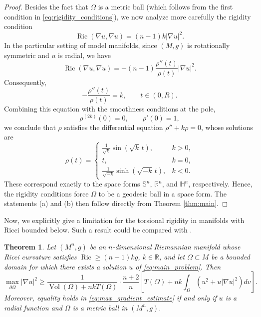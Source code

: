 \documentclass[reqno,11pt]{amsart}
\numberwithin{equation}{section}  %
\newtheorem{theorem}{Theorem}[section]
\begin{document}
\begin{proof}
Besides the fact that $\Omega$ is a metric ball (which follows from the first condition in \eqref{eq:rigidity_conditions}), we now analyze more carefully the rigidity condition
\[\operatorname{Ric}(\nabla u,\nabla u) = (n-1)k|\nabla u|^2.\]
In the particular setting of model manifolds, since $(M,g)$ is rotationally symmetric and $u$ is radial, we have
\[\operatorname{Ric}(\nabla u,\nabla u) = -(n-1)\frac{\rho''(t)}{\rho(t)}|\nabla u|^2.\]
Consequently,
\[-\frac{\rho''(t)}{\rho(t)} = k,\qquad t\in(0,R).\]
Combining this equation with the smoothness conditions at the pole,
\[\rho^{(2k)}(0)=0,\qquad \rho'(0)=1,\]
we conclude that $\rho$ satisfies the differential equation $\rho'' + k\rho = 0$, whose solutions are
\[\rho(t) = 
\begin{cases}
\frac{1}{\sqrt{k}}\sin(\sqrt{k}\,t), & k>0,\\[4pt]
t, & k=0,\\[4pt]
\frac{1}{\sqrt{-k}}\sinh(\sqrt{-k}\,t), & k<0.
\end{cases}\]
These correspond exactly to the space forms $\mathbb{S}^n$, $\mathbb{R}^n$, and $\mathbb{H}^n$, respectively. Hence, the rigidity conditions force $\Omega$ to be a geodesic ball in a space form. The statements (a) and (b) then follow directly from Theorem \ref{thm:main}.
\end{proof}

Now, we explicitly give a limitation for the torsional rigidity in manifolds with Ricci bounded below. Such a result could be compared with \cite[Theorem 1.7]{wang2020}.

\begin{theorem}\label{thm:gradient_estimate}
Let $(M^n,g)$ be an $n$-dimensional Riemannian manifold whose Ricci curvature satisfies $\operatorname{Ric}\geq (n-1)kg$, $k\in\mathbb{R}$, and let $\Omega\subset M$ be a bounded domain for which there exists a solution $u$ of \eqref{eq:main_problem}. Then
\begin{equation}\label{eq:max_gradient_estimate}
\max_{\partial\Omega}|\nabla u|^2\geq \frac{1}{\operatorname{Vol}(\Omega) + nkT(\Omega)}\cdot\frac{n+2}{n}\left[T(\Omega) + nk\int_{\Omega}\left(u^2 + u|\nabla u|^2\right)dv\right].
\end{equation}
Moreover, equality holds in \eqref{eq:max_gradient_estimate} if and only if $u$ is a radial function and $\Omega$ is a metric ball in $(M^n,g)$.
\end{theorem}
\end{document}
